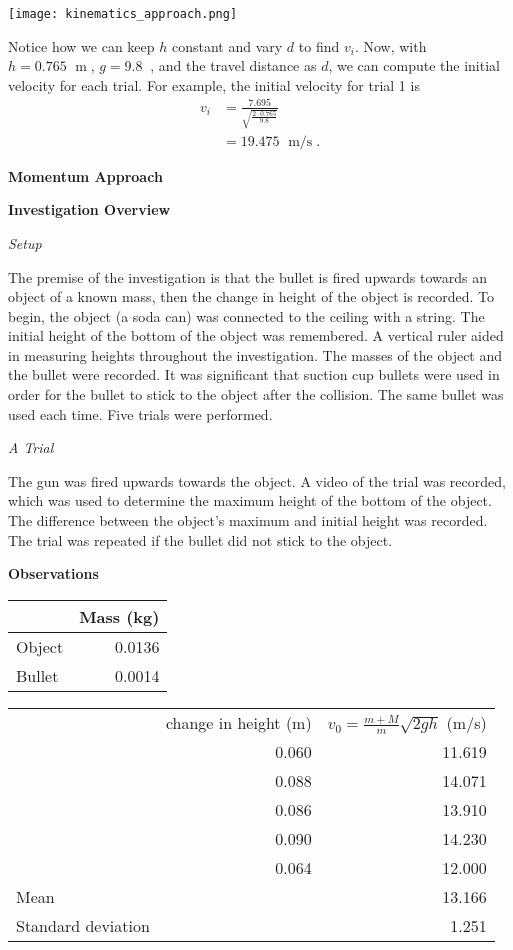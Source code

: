 \documentclass[12pt]{article}
\newcommand{\double}[0]{\par\null\par}
\DeclareMathOperator{\m}{\ m}
\DeclareMathOperator{\ms}{\ m/s}
\DeclareMathOperator{\mssq}{\ m/s^2}
\newcommand{\bigheader}[1]{\LARGE\textbf{#1}\normalsize}
\newcommand{\header}[1]{\large\textbf{#1}\normalsize}
\newcommand{\lilheader}[1]{\textit{#1}}
\begin{document}
\texttt{[image: kinematics\_approach.png]}

Notice how we can keep $h$ constant and vary $d$ to find $v_i$. Now, with $h=0.765\m$, $g=9.8\mssq$, and the travel distance as
$d$, we can compute the initial velocity for each trial. For example, the initial velocity for trial 1 is
\begin{align*}
v_i&=\frac{7.695}{\sqrt{\frac{2\cdot0.765}{9.8}}} \\
&=19.475\ms.
\end{align*}

\double\null\par\bigheader{Momentum Approach}

\header{Investigation Overview}

\lilheader{Setup}

The premise of the investigation is that the bullet is fired upwards towards an object of a known mass, then the change in height
of the object is recorded. To begin, the object (a soda can) was connected to the ceiling with a string. The initial height of the
bottom of the object was remembered. A vertical ruler aided in measuring heights throughout the investigation.  The masses of the
object and the bullet were recorded. It was significant that suction cup bullets were used in order for the bullet to stick to the
object after the collision. The same bullet was used each time. Five trials were performed.

\double\lilheader{A Trial}

The gun was fired upwards towards the object. A video of the trial was recorded, which was used to determine the maximum height of
the bottom of the object. The difference between the object's maximum and initial height was recorded. The trial was repeated if
the bullet did not stick to the object.

\double\header{Observations}\double

\begin{center}
\begin{tabular}{l|r}
& Mass (kg) \\ \hline
Object & 0.0136 \\
Bullet & 0.0014
\end{tabular}

\begin{tabular}{lr|r}
& change in height (m) & $v_0=\frac{m+M}{m}\sqrt{2gh}$ (m/s) \\
\cline{2-3}
& 0.060 & 11.619\\
& 0.088 & 14.071 \\
& 0.086 & 13.910 \\
& 0.090 & 14.230 \\
& 0.064 & 12.000 \\
\hline
Mean & & 13.166 \\
Standard deviation & & 1.251 \\
\end{tabular}
\end{center}
\end{document}
